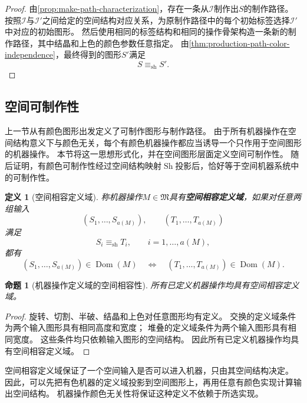 \documentclass[UTF8,fontset=none]{ctexart}
\theoremstyle{cnthm}
\newtheorem{definition}{定义}[section]
\newtheorem{proposition}{命题}[section]
\begin{document}
			\begin{proof}
				由\cref{prop:make-path-characterization}，存在一条从$\mathcal{I}$制作出$S$的制作路径。
				按照$\mathcal{I}$与$\mathcal{I}'$之间给定的空间结构对应关系，为原制作路径中的每个初始标签选择$\mathcal{I}'$中对应的初始图形。
				然后使用相同的标签结构和相同的操作骨架构造一条新的制作路径，其中结晶和上色的颜色参数任意指定。
				由\cref{thm:production-path-color-independence}，最终得到的图形$S'$满足
				$$
				S\equiv_{\mathrm{sh}}S'.
				$$
			\end{proof}
			
		\subsection{空间可制作性}
			
			上一节从有颜色图形出发定义了可制作图形与制作路径。
			由于所有机器操作在空间结构意义下与颜色无关，每个有颜色机器操作都应当诱导一个只作用于空间图形的机器操作。
			本节将这一思想形式化，并在空间图形层面定义空间可制作性。
			随后证明，有颜色可制作性经过空间结构映射$\operatorname{Sh}$投影后，恰好等于空间机器系统中的可制作性。
			
			\begin{definition}[空间相容定义域]
				称机器操作$M\in\mathfrak{M}$具有\textbf{空间相容定义域}，如果对任意两组输入
				$$
				(S_1,\dots,S_{a(M)}),
				\qquad
				(T_1,\dots,T_{a(M)})
				$$
				满足
				$$
				S_i\equiv_{\mathrm{sh}}T_i,
				\qquad i=1,\dots,a(M),
				$$
				都有
				$$
				(S_1,\dots,S_{a(M)})\in\operatorname{Dom}(M)
				\quad\Longleftrightarrow\quad
				(T_1,\dots,T_{a(M)})\in\operatorname{Dom}(M).
				$$
			\end{definition}
			
			\begin{proposition}[机器操作定义域的空间相容性]\label{prop:machine-domain-shape-compatible}
				所有已定义机器操作均具有空间相容定义域。
			\end{proposition}
			
			\begin{proof}
				旋转、切割、半破、结晶和上色对任意图形均有定义。
				交换的定义域条件为两个输入图形具有相同高度和宽度；
				堆叠的定义域条件为两个输入图形具有相同宽度。
				这些条件均只依赖输入图形的空间结构。
				因此所有已定义机器操作均具有空间相容定义域。
			\end{proof}
			
			空间相容定义域保证了一个空间输入是否可以进入机器，只由其空间结构决定。
			因此，可以先把有色机器的定义域投影到空间图形上，再用任意有颜色实现计算输出空间结构。
			机器操作颜色无关性将保证这种定义不依赖于所选实现。
			
\end{document}

